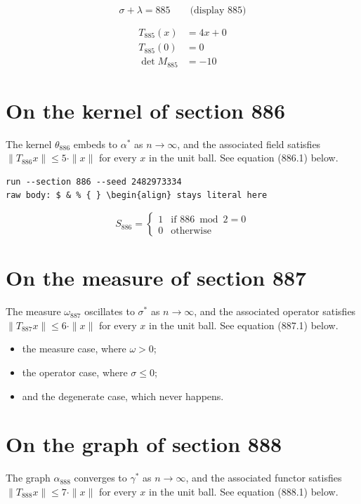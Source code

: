 \documentclass{article}
\begin{document}
$$
\sigma + \lambda = 885 \qquad \text{(display 885)}
$$

\begin{align}
T_{885}(x) &= 4 x + 0 \\
T_{885}(0) &= 0 \\
\det M_{885} &= -10
\end{align}

\section{On the kernel of section 886}
The kernel $\theta_{886}$ embeds to $\alpha^{*}$ as $n \to \infty$,
and the associated field satisfies $\|T_{886} x\| \leq 5 \cdot \|x\|$
for every $x$ in the unit ball. See equation (886.1) below.

\begin{verbatim}
run --section 886 --seed 2482973334
raw body: $ & % { } \begin{align} stays literal here
\end{verbatim}

\begin{equation}
S_{886} = \begin{cases} 1 & \text{if } 886 \bmod 2 = 0 \\ 0 & \text{otherwise} \end{cases}
\end{equation}

\section{On the measure of section 887}
The measure $\omega_{887}$ oscillates to $\sigma^{*}$ as $n \to \infty$,
and the associated operator satisfies $\|T_{887} x\| \leq 6 \cdot \|x\|$
for every $x$ in the unit ball. See equation (887.1) below.

\begin{itemize}
  \item the measure case, where $\omega > 0$;
  \item the operator case, where $\sigma \leq 0$;
  \item and the degenerate case, which never happens.
\end{itemize}

\section{On the graph of section 888}
The graph $\alpha_{888}$ converges to $\gamma^{*}$ as $n \to \infty$,
and the associated functor satisfies $\|T_{888} x\| \leq 7 \cdot \|x\|$
for every $x$ in the unit ball. See equation (888.1) below.
\end{document}
